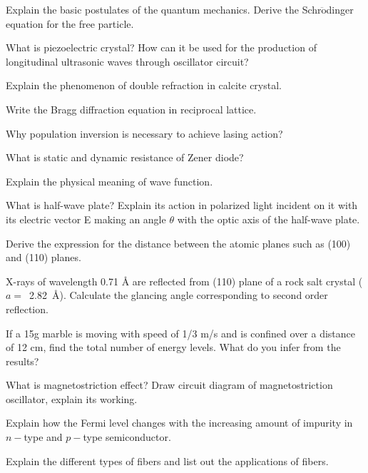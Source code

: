 \item 
\iitem Explain the basic postulates of the quantum mechanics. Derive the Schr$\ddot{\text{o}}$dinger
  equation for the free particle.
\Or
\item What is piezoelectric crystal? How can it be used for the production of longitudinal ultrasonic
    waves through oscillator circuit?
\ene

\markC
\ene

\newpage

\sub{\subj}
\maxtime

\partA

\iitem Explain the phenomenon of double refraction in calcite crystal.
\item Write the Bragg diffraction equation in reciprocal lattice.
\item Why population inversion is necessary to achieve lasing action?
\item What is static and dynamic resistance of Zener diode?
\item Explain the physical meaning of wave function.

\markA
\partB

\item What is half-wave plate? Explain its action in polarized light incident on it with its electric
  vector E making an angle $\theta$ with the optic axis of the half-wave plate.
\item
\iitem Derive the expression for the distance between the atomic planes such as (100) and (110) planes.
\item X-rays of wavelength 0.71 \AA{} are reflected from (110) plane of a rock salt crystal
  ($a=$~2.82~\AA{}). Calculate the glancing angle corresponding to second order reflection.
\ene

\item If a 15g marble is moving with speed of 1/3 m/s and is confined over a distance of 12 cm, find the
  total number of energy levels. What do you infer from the results?
\item What is magnetostriction effect? Draw circuit diagram of magnetostriction oscillator, explain its
  working.
\item Explain how the Fermi level changes with the increasing amount of impurity in $n-$type and $p-$type
  semiconductor.
\item Explain the different types of fibers and list out the applications of fibers.

\markB

